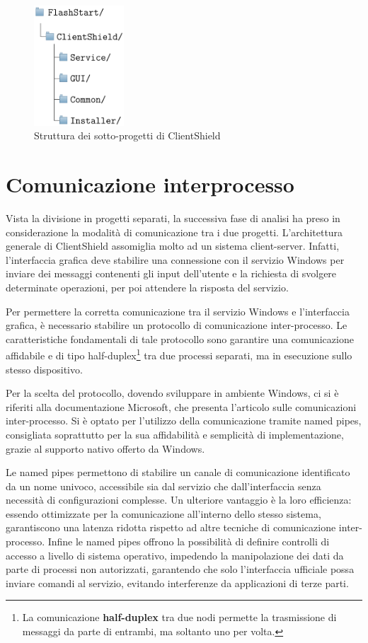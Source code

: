 \documentclass[12pt,a4paper,openright,twoside]{book}
\begin{document}
\begin{figure}[H]
	\centering
	\includegraphics[width=0.3\textwidth]{figures/directory.png}
	\caption{Struttura dei sotto-progetti di ClientShield}
	\label{fig:struttura-directory-clientshield}
\end{figure}

\section{Comunicazione interprocesso}

Vista la divisione in progetti separati, la successiva fase di analisi ha preso in considerazione la modalità di comunicazione tra i due progetti.
L'architettura generale di ClientShield assomiglia molto ad un sistema client-server.
Infatti, l'interfaccia grafica deve stabilire una connessione con il servizio Windows per inviare dei messaggi contenenti gli input dell'utente e la richiesta di svolgere determinate operazioni, per poi attendere la risposta del servizio.

Per permettere la corretta comunicazione tra il servizio Windows e l'interfaccia grafica, è necessario stabilire un protocollo di comunicazione inter-processo.
Le caratteristiche fondamentali di tale protocollo sono garantire una comunicazione affidabile e di tipo half-duplex\footnote{La comunicazione \textbf{half-duplex} tra due nodi permette la trasmissione di messaggi da parte di entrambi, ma soltanto uno per volta.} tra due processi separati, ma in esecuzione sullo stesso dispositivo.

Per la scelta del protocollo, dovendo sviluppare in ambiente Windows, ci si è riferiti alla documentazione Microsoft, che presenta l'articolo \cite{MicrosoftIPC2024} sulle comunicazioni inter-processo.
Si è optato per l'utilizzo della comunicazione tramite named pipes, consigliata soprattutto per la sua affidabilità e semplicità di implementazione, grazie al supporto nativo offerto da Windows.

Le named pipes permettono di stabilire un canale di comunicazione identificato da un nome univoco, accessibile sia dal servizio che dall'interfaccia senza necessità di configurazioni complesse.   
Un ulteriore vantaggio è la loro efficienza: essendo ottimizzate per la comunicazione all'interno dello stesso sistema, garantiscono una latenza ridotta rispetto ad altre tecniche di comunicazione inter-processo.  
Infine le named pipes offrono la possibilità di definire controlli di accesso a livello di sistema operativo, impedendo la manipolazione dei dati da parte di processi non autorizzati, garantendo che solo l'interfaccia ufficiale possa inviare comandi al servizio, evitando interferenze da applicazioni di terze parti.
\end{document}
